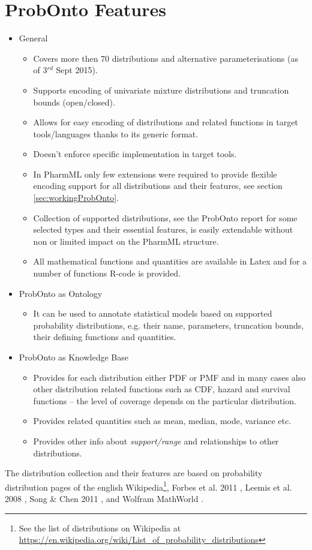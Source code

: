 \section{ProbOnto Features}
\begin{itemize}
\item
General 
\begin{itemize}
\item
Covers more then 70 distributions and alternative parameterisations (as of 3$^{rd}$ Sept 2015).
\item
Supports encoding of univariate mixture distributions and truncation bounds (open/closed).
\item
Allows for easy encoding of distributions and related functions in target 
tools/languages thanks to its generic format.
\item
Doesn't enforce specific implementation in target tools.
\item
In PharmML only few extensions were required to provide flexible encoding support
for all distributions and their features, see section \ref{sec:workingProbOnto}.
\item
Collection of supported distributions, see the ProbOnto report \cite{ProbOnto:2015a} for 
some selected types and their essential features, is easily extendable 
without non or limited impact on the PharmML structure.
\item
All mathematical functions and quantities are available in Latex and  for a number 
of functions R-code is provided.
\end{itemize}
\item
ProbOnto as Ontology
\begin{itemize}
\item
It can be used to annotate statistical models based on supported probability 
distributions, e.g. their name, parameters, truncation bounds, their defining 
functions and quantities.
\end{itemize}
\item
ProbOnto as Knowledge Base
\begin{itemize}
\item
Provides for each distribution either PDF or PMF and in many cases also 
other distribution related functions such as CDF, hazard and survival functions 
-- the level of coverage depends on the particular distribution. 
\item
Provides related quantities such as mean, median, mode, variance etc.
\item
Provides other info about \emph{support/range} and relationships to other distributions.
\end{itemize}
\end{itemize}
The distribution collection and their features are based on
probability distribution pages of the english Wikipedia\footnote{See the list of 
distributions on Wikipedia at \url{https://en.wikipedia.org/wiki/List_of_probability_distributions}}, 
Forbes et al. 2011 \cite{forbes2011statistical}, Leemis et al. 2008 \cite{Leemis:2008tg}, 
Song \& Chen 2011 \cite{song2011eighty}, and 
Wolfram MathWorld \cite{weisstein2007wolfram}.

